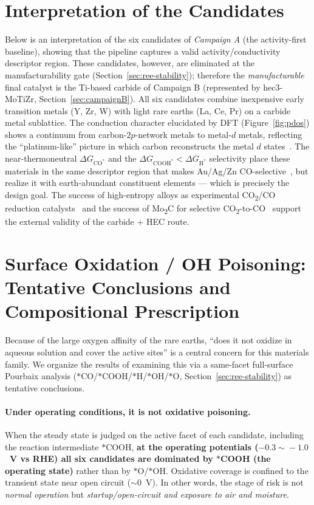 \documentclass[11pt,a4paper]{report}
\newcommand{\dGCO}{\Delta G_{\mathrm{CO^*}}}
\newcommand{\dGH}{\Delta G_{\mathrm{H^*}}}
\newcommand{\dGCOOH}{\Delta G_{\mathrm{COOH^*}}}
\begin{document}
\section{Interpretation of the Candidates}
Below is an interpretation of the six candidates of \emph{Campaign A} (the activity-first baseline), showing
that the pipeline captures a valid activity/conductivity descriptor region. These candidates, however, are
eliminated at the manufacturability gate (Section~\ref{sec:ree-stability}); therefore the \emph{manufacturable}
final catalyst is the Ti-based carbide of Campaign B (represented by hec3-MoTiZr, Section~\ref{sec:campaignB}).
All six candidates combine inexpensive early transition metals (Y, Zr, W) with light rare earths (La, Ce, Pr)
on a carbide metal sublattice. The conduction character elucidated by DFT (Figure~\ref{fig:pdos}) shows a
continuum from carbon-$2p$-network metals to metal-$d$ metals, reflecting the ``platinum-like'' picture in which
carbon reconstructs the metal $d$ states~\cite{levy1973}. The near-thermoneutral $\dGCO$ and the $\dGCOOH<\dGH$
selectivity place these materials in the same descriptor region that makes Au/Ag/Zn CO-selective~\cite{hori2008},
but realize it with earth-abundant constituent elements --- which is precisely the design goal. The success of
high-entropy alloys as experimental CO\textsubscript{2}/CO reduction catalysts~\cite{nellaiappan2020,batchelor2019}
and the success of Mo\textsubscript{2}C for selective CO\textsubscript{2}-to-CO~\cite{porosoff2014} support the
external validity of the carbide + HEC route.

\section{Surface Oxidation / OH Poisoning: Tentative Conclusions and Compositional Prescription}
\label{sec:disc-poison}
Because of the large oxygen affinity of the rare earths, ``does it not oxidize in aqueous solution and cover the
active sites'' is a central concern for this materials family. We organize the results of examining this via a
same-facet full-surface Pourbaix analysis ($*$CO/$*$COOH/$*$H/$*$OH/$*$O, Section~\ref{sec:ree-stability}) as
tentative conclusions.

\paragraph{Under operating conditions, it is not oxidative poisoning.} When the steady state is judged on the
active facet of each candidate, including the reaction intermediate $*$COOH, \textbf{at the operating potentials
($-0.3\!\sim\!-1.0$~V vs RHE) all six candidates are dominated by $*$COOH (the operating state)} rather than by
$*$O/$*$OH. Oxidative coverage is confined to the transient state near open circuit ($\sim\!0$~V). In other
words, the stage of risk is not \emph{normal operation} but \emph{startup/open-circuit and exposure to air and
moisture}.
\end{document}
